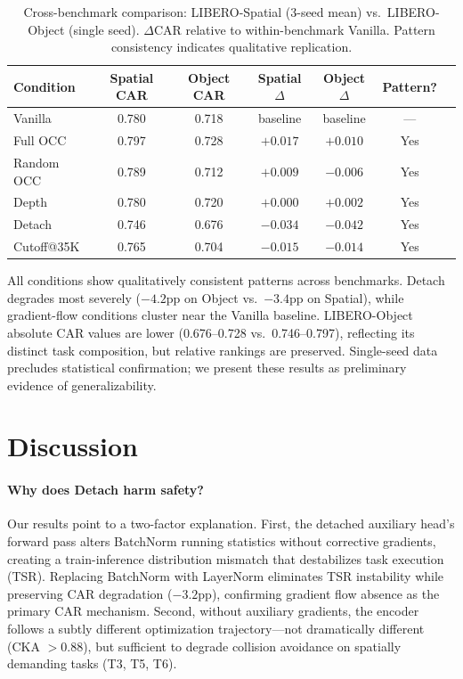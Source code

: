 \documentclass[10pt,letterpaper]{article}
\begin{document}
\begin{table}[t]
\centering
\caption{Cross-benchmark comparison: LIBERO-Spatial (3-seed mean) vs.\ LIBERO-Object (single seed). $\Delta$CAR relative to within-benchmark Vanilla. Pattern consistency indicates qualitative replication.}
\label{tab:cross}
\begin{tabular}{lcccccc}
\toprule
Condition & Spatial CAR & Object CAR & Spatial $\Delta$ & Object $\Delta$ & Pattern? \\
\midrule
Vanilla    & 0.780 & 0.718 & baseline & baseline & --- \\
Full OCC   & 0.797 & 0.728 & $+0.017$ & $+0.010$ & Yes \\
Random OCC & 0.789 & 0.712 & $+0.009$ & $-0.006$ & Yes \\
Depth      & 0.780 & 0.720 & $+0.000$ & $+0.002$ & Yes \\
Detach     & 0.746 & 0.676 & $-0.034$ & $-0.042$ & Yes \\
Cutoff@35K & 0.765 & 0.704 & $-0.015$ & $-0.014$ & Yes \\
\bottomrule
\end{tabular}
\end{table}

All conditions show qualitatively consistent patterns across benchmarks. Detach degrades most severely ($-4.2$pp on Object vs.\ $-3.4$pp on Spatial), while gradient-flow conditions cluster near the Vanilla baseline. LIBERO-Object absolute CAR values are lower (0.676--0.728 vs.\ 0.746--0.797), reflecting its distinct task composition, but relative rankings are preserved. Single-seed data precludes statistical confirmation; we present these results as preliminary evidence of generalizability.

\section{Discussion}
\label{sec:discussion}

\paragraph{Why does Detach harm safety?}
Our results point to a two-factor explanation. First, the detached auxiliary head's forward pass alters BatchNorm running statistics without corrective gradients, creating a train-inference distribution mismatch that destabilizes task execution (TSR). Replacing BatchNorm with LayerNorm eliminates TSR instability while preserving CAR degradation ($-3.2$pp), confirming gradient flow absence as the primary CAR mechanism. Second, without auxiliary gradients, the encoder follows a subtly different optimization trajectory---not dramatically different (CKA $> 0.88$), but sufficient to degrade collision avoidance on spatially demanding tasks (T3, T5, T6).
\end{document}
